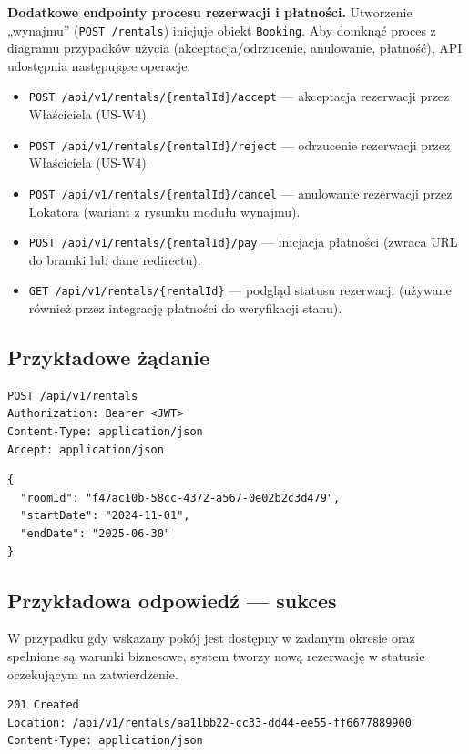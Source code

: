 \documentclass[11pt, a4paper]{article}
\begin{document}
\noindent\textbf{Dodatkowe endpointy procesu rezerwacji i płatności.} Utworzenie „wynajmu” (\texttt{POST /rentals}) inicjuje obiekt \texttt{Booking}.
Aby domknąć proces z diagramu przypadków użycia (akceptacja/odrzucenie, anulowanie, płatność), API udostępnia następujące operacje:
\begin{itemize}
    \item \texttt{POST /api/v1/rentals/\{rentalId\}/accept} --- akceptacja rezerwacji przez Właściciela (US-W4).
    \item \texttt{POST /api/v1/rentals/\{rentalId\}/reject} --- odrzucenie rezerwacji przez Właściciela (US-W4).
    \item \texttt{POST /api/v1/rentals/\{rentalId\}/cancel} --- anulowanie rezerwacji przez Lokatora (wariant z rysunku modułu wynajmu).
    \item \texttt{POST /api/v1/rentals/\{rentalId\}/pay} --- inicjacja płatności (zwraca URL do bramki lub dane redirectu).
    \item \texttt{GET /api/v1/rentals/\{rentalId\}} --- podgląd statusu rezerwacji (używane również przez integrację płatności do weryfikacji stanu).
\end{itemize}


\subsection{Przykładowe żądanie}

\begin{lstlisting}[style=http,caption={Żądanie HTTP — wynajem pokoju}]
POST /api/v1/rentals
Authorization: Bearer <JWT>
Content-Type: application/json
Accept: application/json
\end{lstlisting}

\begin{lstlisting}[style=json,caption={Ciało żądania — wynajem pokoju}]
{
  "roomId": "f47ac10b-58cc-4372-a567-0e02b2c3d479",
  "startDate": "2024-11-01",
  "endDate": "2025-06-30"
}
\end{lstlisting}

\subsection{Przykładowa odpowiedź — sukces}

W przypadku gdy wskazany pokój jest dostępny w zadanym okresie oraz spełnione
są warunki biznesowe, system tworzy nową rezerwację w statusie oczekującym na
zatwierdzenie.

\begin{lstlisting}[style=http,caption={Odpowiedź HTTP — sukces}]
201 Created
Location: /api/v1/rentals/aa11bb22-cc33-dd44-ee55-ff6677889900
Content-Type: application/json
\end{lstlisting}
\end{document}
